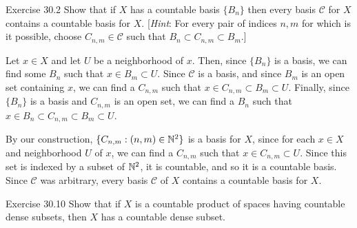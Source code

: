 \documentclass{hmwk}
\begin{document}
\maketitle
\begin{problem}{Exercise 30.2}
    Show that if $X$ has a countable basis $\{B_n\}$ then every basis $\mathcal{C}$ for $X$ contains a countable basis for $X$. [\textit{Hint}: For every pair of indices $n, m$ for which is it possible, choose $C_{n, m} \in \mathcal{C}$ such that $B_n \subset C_{n, m} \subset B_m$.]
\end{problem}

\begin{solution}

\pre Let $x \in X$ and let $U$ be a neighborhood of $x$. Then, since $\{B_n\}$ is a basis, we can find some $B_n$ such that $x \in B_m \subset U$. Since $\mathcal{C}$ is a basis, and since $B_m$ is an open set containing $x$, we can find a $C_{n, m}$ such that $x \in C_{n, m} \subset B_m \subset U$. Finally, since $\{B_n\}$ is a basis and $C_{n, m}$ is an open set, we can find a $B_n$ such that $x \in B_n \subset C_{n, m} \subset B_m \subset U$. 

\pre By our construction, $\{C_{n, m} : (n, m) \in \mathbb{N}^2\}$ is a basis for $X$, since for each $x \in X$ and neighborhood $U$ of $x$, we can find a $C_{n, m}$ such that $x \in C_{n, m} \subset U$. Since this set is indexed by a subset of $\mathbb{N}^2$, it is countable, and so it is a countable basis. Since $\mathcal{C}$ was arbitrary, every basis $\mathcal{C}$ of $X$ contains a countable basis for $X$.
\end{solution}

\begin{problem}{Exercise 30.10}
    Show that if $X$ is a countable product of spaces having countable dense subsets, then $X$ has a countable dense subset. 
\end{problem}
\end{document}
